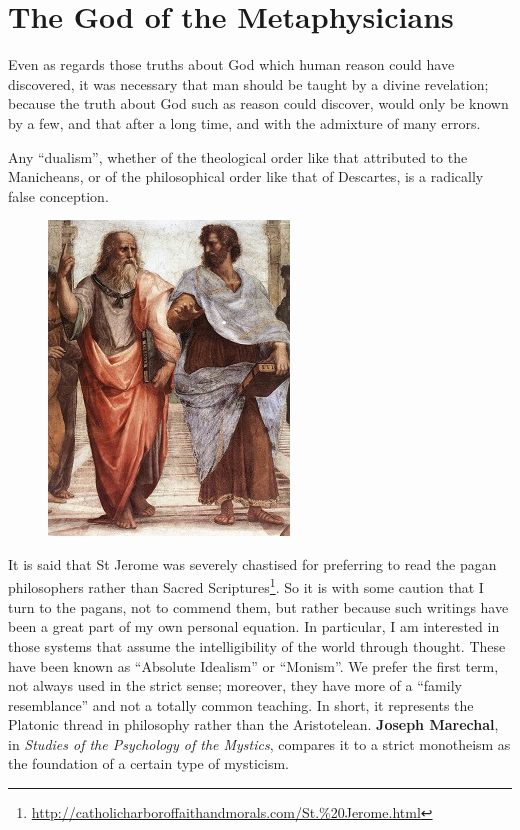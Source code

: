 \section{The God of the Metaphysicians}

\begin{quotationx}
Even as regards those truths about God which human reason could have discovered, it was necessary that man should be
taught by a divine revelation; because the truth about God such as reason could discover, would only be known by a few,
and that after a long time, and with the admixture of many errors.  

Any “dualism”, whether of the theological order like that attributed to the Manicheans, or of the philosophical order
like that of Descartes, is a radically false conception. 

\end{quotationx}

\begin{figure}
 \includegraphics[scale=2.1]{a20151103TheGodofTheMetaphysicians-img001.jpg} 
\end{figure}

It is said that St Jerome was severely chastised for preferring to read the pagan philosophers rather than Sacred
Scriptures\footnote{\url{http://catholicharboroffaithandmorals.com/St.\%20Jerome.html}}. So it is with some caution that I turn to the pagans, not to commend them, but rather because such writings
have been a great part of my own personal equation. In particular, I am interested in those systems that assume the
intelligibility of the world through thought. These have been known as “Absolute Idealism” or “Monism”. We prefer the
first term, not always used in the strict sense; moreover, they have more of a “family resemblance” and not a totally
common teaching. In short, it represents the Platonic thread in philosophy rather than the Aristotelean. \textbf{Joseph
Marechal}, in \emph{Studies of the Psychology of the Mystics}, compares it to a strict monotheism as the foundation of
a certain type of mysticism.

